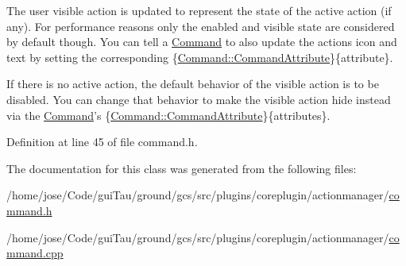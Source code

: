 The user visible action is updated to represent the state of the active action (if any). For performance reasons only the enabled and visible state are considered by default though. You can tell a \hyperlink{class_core_1_1_command}{Command} to also update the actions icon and text by setting the corresponding \{\hyperlink{group___core_plugin_ga4d899c1f711159a432afeab3eb78c917}{Command\-::\-Command\-Attribute}\}\{attribute\}.

If there is no active action, the default behavior of the visible action is to be disabled. You can change that behavior to make the visible action hide instead via the \hyperlink{class_core_1_1_command}{Command}'s \{\hyperlink{group___core_plugin_ga4d899c1f711159a432afeab3eb78c917}{Command\-::\-Command\-Attribute}\}\{attributes\}. 

Definition at line 45 of file command.\-h.



The documentation for this class was generated from the following files\-:\begin{DoxyCompactItemize}
\item 
/home/jose/\-Code/gui\-Tau/ground/gcs/src/plugins/coreplugin/actionmanager/\hyperlink{command_8h}{command.\-h}\item 
/home/jose/\-Code/gui\-Tau/ground/gcs/src/plugins/coreplugin/actionmanager/\hyperlink{command_8cpp}{command.\-cpp}\end{DoxyCompactItemize}
